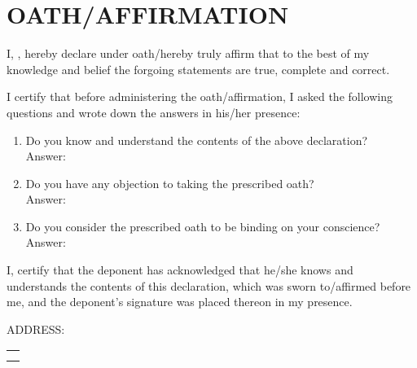 \newpage
{}
\section{OATH/AFFIRMATION}
\begin{Form}
    I, , hereby declare under oath/hereby truly affirm that to the best of my knowledge and belief the forgoing statements are true, complete and correct.
    
    \vspace{1.5cm}
    
    \vspace{0.5cm}
    I certify that before administering the oath/affirmation, I asked the following questions and wrote down the answers in his/her presence:
    
    \begin{enumerate}
        \item Do you know and understand the contents of the above declaration? \\
        Answer: \fieldinline{}{2cm}
        \item Do you have any objection to taking the prescribed oath? \\
        Answer: \fieldinline{}{2cm}
        \item Do you consider the prescribed oath to be binding on your conscience? \\
        Answer: \fieldinline{}{2cm}
    \end{enumerate}
    
    I, certify that the deponent has acknowledged that he/she knows and understands the contents of this declaration, which was sworn to/affirmed before me, and the deponent's signature was placed thereon in my presence.
    
    \vspace{1cm}
    
    \vspace{1cm}
    
    \vspace{1cm}
    
    \vspace{0.5cm}
    ADDRESS:
    \begin{tabular}{p{10cm}}
    \vspace{0.5cm} \\ \hline
    \vspace{0.5cm} \\ \hline
    \vspace{0.5cm} \\ \hline
    \end{tabular}
    
    \vspace{1cm}
\end{Form}